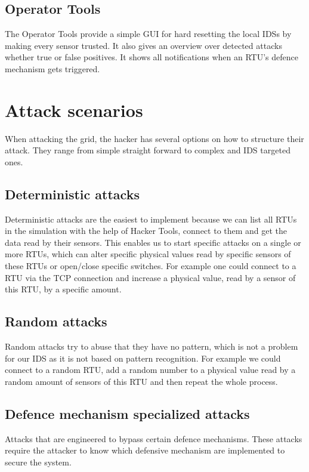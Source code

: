 \documentclass[conference]{IEEEtran}
\begin{document}
	\subsection{Operator Tools}
		
		The Operator Tools provide a simple GUI for hard resetting the local IDSs by making every sensor trusted. It also gives an overview over detected attacks whether true or false positives. It shows all notifications when an RTU's defence mechanism gets triggered.

\section{Attack scenarios}

	When attacking the grid, the hacker has several options on how to structure their attack. They range from simple straight forward to complex and IDS targeted ones.
	
	\subsection{Deterministic attacks}
	
		Deterministic attacks are the easiest to implement because we can list all RTUs in the simulation with the help of Hacker Tools, connect to them and get the data read by their sensors. This enables us to start specific attacks on a single or more RTUs, which can alter specific physical values read by specific sensors of these RTUs or open/close specific switches. For example one could connect to a RTU via the TCP connection and increase a physical value, read by a sensor of this RTU, by a specific amount.
		
	\subsection{Random attacks}
	
		Random attacks try to abuse that they have no pattern, which is not a problem for our IDS as it is not based on pattern recognition. For example we could connect to a random RTU, add a random number to a physical value read by a random amount of sensors of this RTU and then repeat the whole process.
		
	\subsection{Defence mechanism specialized attacks}
	
		Attacks that are engineered to bypass certain defence mechanisms. These attacks require the attacker to know which defensive mechanism are implemented to secure the system.
	
\end{document}
